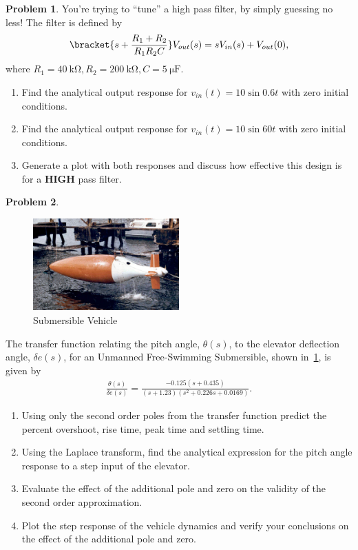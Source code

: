 \documentclass[10pt]{article}
\theoremstyle{definition}
\newtheorem{prob}{Problem}[section]
\newenvironment{subprob}%
{\renewcommand{\theenumi}{\alph{enumi}}\renewcommand{\labelenumi}{(\theenumi)}\begin{enumerate}}%
{\end{enumerate}}%
\begin{document}
\clearpage\newpage
\begin{prob}
    You're trying to ``tune'' a high pass filter,  by simply guessing no less!
    The filter is defined by
    \begin{align}
    \bracket{s + \frac{R_1 + R_2}{R_1 R_2 C} } V_{out}(s) = s V_{in}(s) + V_{out}(0) ,
    \end{align}
    where \( R_1 = \SI{40}{\kilo\ohm}, R_2 = \SI{200}{\kilo\ohm}, C = \SI{5}{\micro\farad}\).
    \begin{subprob}
    \item Find the analytical output response for \( v_{in}(t) = 10 \sin 0.6 t \) with zero initial conditions.
    \item Find the analytical output response for \( v_{in}(t) = 10 \sin 60 t \) with zero initial conditions.
    \item  Generate a plot with both responses and discuss how effective this design is for a \textbf{HIGH} pass filter.
    \end{subprob}
\end{prob}


\begin{prob}
    \begin{figure}[h]
        \centering
        \includegraphics[width=0.5\textwidth]{./figures/UFSS-TEST-PHOTO-1.jpg}
        \caption{Submersible Vehicle~\label{fig:vehicle}}
    \end{figure}
    The transfer function relating the pitch angle, \( \theta (s) \), to the elevator deflection angle, \( \delta e (s) \), for an Unmanned Free-Swimming Submersible, shown in~\cref{fig:vehicle}, is given by
    \begin{align}
        \frac{\theta (s) }{\delta e(s)} = \frac{-0.125 (s + 0.435)}{(s+1.23)(s^2 + 0.226 s + 0.0169)} .
    \end{align}

    \begin{subprob}
    \item Using only the second order poles from the transfer function predict the percent overshoot, rise time, peak time and settling time.
    \item Using the Laplace transform, find the analytical expression for the pitch angle response to a step input of the elevator.
    \item Evaluate the effect of the additional pole and zero on the validity of the second order approximation.
    \item Plot the step response of the vehicle dynamics and verify your conclusions on the effect of the additional pole and zero.
    \end{subprob}
\end{prob}
\end{document}

